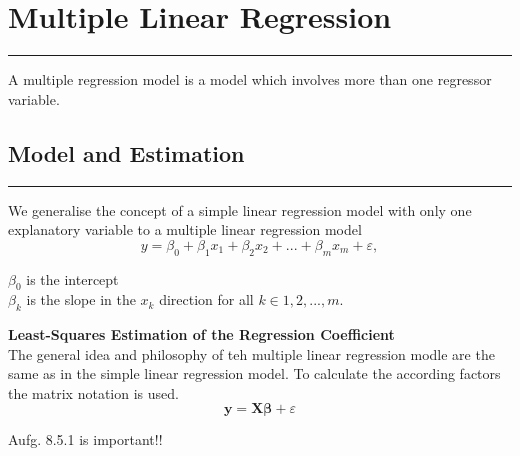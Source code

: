 \section{Multiple Linear Regression}
\noindent\rule[\linienAbstand]{\linewidth}{\linienDickeDick}
A multiple regression model is a model which involves more than one regressor variable.\\

\subsection{Model and Estimation}
\noindent\rule[\linienAbstand]{\linewidth}{\linienDicke}
We generalise the concept of a simple linear regression model with only one explanatory variable to a multiple linear regression model
\begin{equation}
  y = \beta_0 + \beta_1 x_1 + \beta_2 x_2 + ... + \beta_m x_m +\varepsilon,
\end{equation}

$\beta_0$ is the intercept\\
$\beta_k$ is the slope in the $x_k$ direction for all $k \in {1, 2, ..., m}$.


\textbf{Least-Squares Estimation of the Regression Coefficient}\\
The general idea and philosophy of teh multiple linear regression modle are the same as in the simple linear regression model. To calculate the according factors the matrix notation is used.
\begin{equation}
  \mathbf{y} = \mathbf{X} \mathbf{\beta} + \varepsilon
\end{equation}

Aufg. 8.5.1 is important!!
